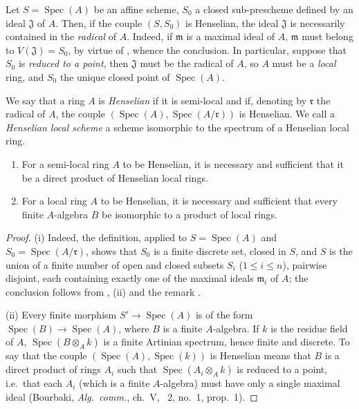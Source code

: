 \begin{remark}[18.5.7]
\label{IV.18.5.7}
Let $S=\operatorname{Spec}(A)$ be an affine scheme, $S_0$ a closed sub-prescheme defined by an ideal $\mathfrak{J}$ of $A$.
Then, if the couple $(S,S_0)$ is Henselian, the ideal $\mathfrak{J}$ is necessarily contained in the \emph{radical} of $A$.
Indeed, if $\mathfrak{m}$ is a maximal ideal of $A$, $\mathfrak{m}$ must belong to $V(\mathfrak{J})=S_0$, by virtue of , whence the conclusion.
In particular, suppose that $S_0$ is \emph{reduced to a point}, then $\mathfrak{J}$ must be the radical of $A$, so $A$ must be a \emph{local} ring, and $S_0$ the unique closed point of $\operatorname{Spec}(A)$.
\end{remark}

\begin{definition}[18.5.8]
\label{IV.18.5.8}
We say that a ring $A$ is \emph{Henselian} if it is semi-local and if, denoting by $\mathfrak{r}$ the radical of $A$, the couple $(\operatorname{Spec}(A),\operatorname{Spec}(A/\mathfrak{r}))$ is Henselian.
We call a \emph{Henselian local scheme} a scheme isomorphic to the spectrum of a Henselian local ring.
\end{definition}

\begin{proposition}[18.5.9]
\label{IV.18.5.9}
\begin{enumerate}
  \item[(i)] For a semi-local ring $A$ to be Henselian, it is necessary and sufficient that it be a direct product of Henselian local rings.
  \item[(ii)] For a local ring $A$ to be Henselian, it is necessary and sufficient that every finite $A$-algebra $B$ be isomorphic to a product of local rings.
\end{enumerate}
\end{proposition}

\begin{proof}
(i) Indeed, the definition, applied to $S=\operatorname{Spec}(A)$ and $S_0=\operatorname{Spec}(A/\mathfrak{r})$, shows that $S_0$ is a finite discrete set, closed in $S$, and $S$ is the union of a finite number of open and closed subsets $S_i$ ($1\leq i\leq n$), pairwise disjoint, each containing exactly one of the maximal ideals $\mathfrak{m}_i$ of $A$;
the conclusion follows from , (ii) and the remark .

(ii) Every finite morphism $S'\to\operatorname{Spec}(A)$ is of the form $\operatorname{Spec}(B)\to\operatorname{Spec}(A)$, where $B$ is a finite $A$-algebra.
If $k$ is the residue field of $A$, $\operatorname{Spec}(B\otimes_A k)$ is a finite Artinian spectrum, hence finite and discrete.
To say that the couple $(\operatorname{Spec}(A),\operatorname{Spec}(k))$ is Henselian means that $B$ is a direct product of rings $A_i$ such that $\operatorname{Spec}(A_i\otimes_A k)$ is reduced to a point, i.e.\ that each $A_i$ (which is a finite $A$-algebra) must have only a single maximal ideal (Bourbaki, \emph{Alg.\ comm.}, ch.~V, \textsection~2, no.~1, prop.~1).
\end{proof}

